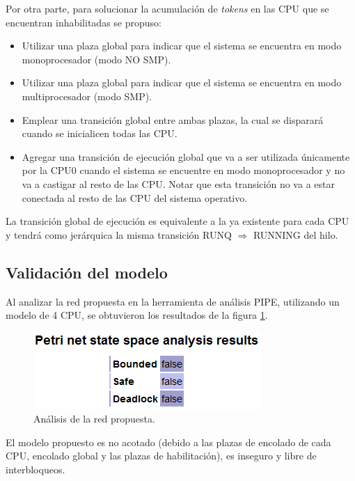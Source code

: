 \documentclass[a4paper]{book}
\begin{document}
Por otra parte, para solucionar la acumulaci\'on de \emph{tokens} en las CPU que se encuentran inhabilitadas se propuso:
\begin{itemize}
\item Utilizar una plaza global para indicar que el sistema se encuentra en modo monoprocesador (modo NO SMP).
\item Utilizar una plaza global para indicar que el sistema se encuentra en modo multiprocesador (modo SMP).
\item Emplear una transici\'on global entre ambas plazas, la cual se disparar\'a cuando se inicialicen todas las CPU.
\item Agregar una transici\'on de ejecuci\'on global que va a ser utilizada \'unicamente por la CPU0 cuando el sistema se encuentre en modo monoprocesador y no va a castigar al resto de las CPU. Notar que esta transici\'on no va a estar conectada al resto de las CPU del sistema operativo.
\end{itemize}
La transici\'on global de ejecuci\'on es equivalente a la ya existente para cada CPU y tendr\'a como jer\'arquica la misma transición RUNQ $\Rightarrow$ RUNNING del hilo.

\subsection{Validaci\'on del modelo}
Al analizar la red propuesta en la herramienta de an\'alisis PIPE, utilizando un modelo de 4 CPU, se obtuvieron los resultados de la figura \ref{Fig:validacion10}.

\begin{figure}[H]
	\begin{center}
        \includegraphics[scale=0.69]{./imagenes/it10validacion.png}
		\caption{An\'alisis de la red propuesta.}
		\label{Fig:validacion10}
	\end{center}
\end{figure}

El modelo propuesto es no acotado (debido a las plazas de encolado de cada CPU, encolado global y las plazas de habilitaci\'on), es inseguro y libre de interbloqueos.
\end{document}
